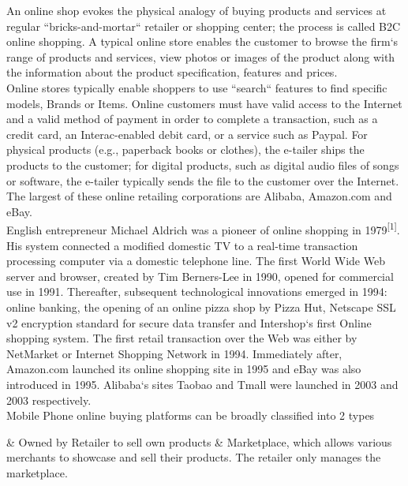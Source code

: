 \documentclass[hidelinks,a4paper,12pt]{article}
\begin{document}
An online shop evokes the physical analogy of buying products and services at regular ``bricks-and-mortar`` retailer or shopping center; the process is called \Gls{B2C} online shopping. A typical online store enables the customer to browse the firm`s range of products and services, view photos or images of the product along with the information about the product specification, features and prices.
\\

Online stores typically enable shoppers to use ``search`` features to find specific models, Brands or Items. Online customers must have valid access to the Internet and a valid method of payment in order to complete a transaction, such as a credit card, an Interac-enabled debit card, or a service such as \Gls{Paypal}. For physical products (e.g., paperback books or clothes), the e-tailer ships the products to the customer; for digital products, such as digital audio files of songs or software, the e-tailer typically sends the file to the customer over the Internet. The largest of these online retailing corporations are Alibaba, Amazon.com and eBay.
\\

English entrepreneur Michael Aldrich was a pioneer of online shopping in 1979\textsuperscript{[1]}. His system connected a modified domestic TV to a \gls{real-time transaction processing} computer  via a domestic telephone line. The first World Wide Web server and browser, created by Tim Berners-Lee in 1990, opened for commercial use in 1991. Thereafter, subsequent technological innovations emerged in 1994: online banking, the opening of an online pizza shop by Pizza Hut, Netscape \Gls{SSL} v2 encryption standard for secure data transfer and Intershop`s first  Online shopping system. The first retail transaction over the Web was either by NetMarket or Internet Shopping Network in 1994. Immediately after, Amazon.com launched its online shopping site in 1995 and eBay was also introduced in 1995. Alibaba`s sites Taobao and Tmall were launched in 2003 and 2003 respectively.
\\

\noindent
Mobile Phone online buying platforms can be broadly classified into 2 types

\begin{easylist}
& \thinspace Owned by Retailer to sell own products
& \thinspace \Gls{Marketplace}, which allows various merchants to showcase and sell their products. The retailer only manages the marketplace.
\end{easylist}
\bigskip
\noindent
\end{document}
